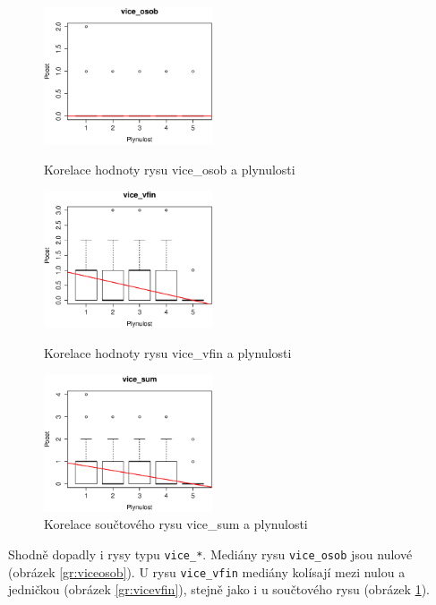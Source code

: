 \documentclass[12pt,a4paper]{report}
\begin{document}
\begin{figure}[!htb]
  \centering\includegraphics[width=50mm]{./grafy/rysy/vice_osob.eps}
  \caption{Korelace hodnoty rysu vice\_osob a plynulosti}\label{gr:viceosob}
\endminipage\hfill
{}
  \centering\includegraphics[width=50mm]{./grafy/rysy/vice_vfin.eps}
  \caption{Korelace hodnoty rysu vice\_vfin a plynulosti}\label{gr:vicevfin}
\endminipage\hfill
{}
  \centering\includegraphics[width=50mm]{./grafy/rysy/vice_sum.eps}
  \caption{Korelace součtového rysu vice\_sum a plynulosti}\label{gr:vicesum}
\endminipage\hfill
\end{figure}

Shodně dopadly i rysy typu \texttt{vice\_*}. Mediány rysu \texttt{vice\_osob} jsou nulové (obrázek \ref{gr:viceosob}). U rysu \texttt{vice\_vfin} mediány kolísají mezi nulou a jedničkou (obrázek \ref{gr:vicevfin}), stejně jako i u součtového rysu (obrázek \ref{gr:vicesum}).
\end{document}
